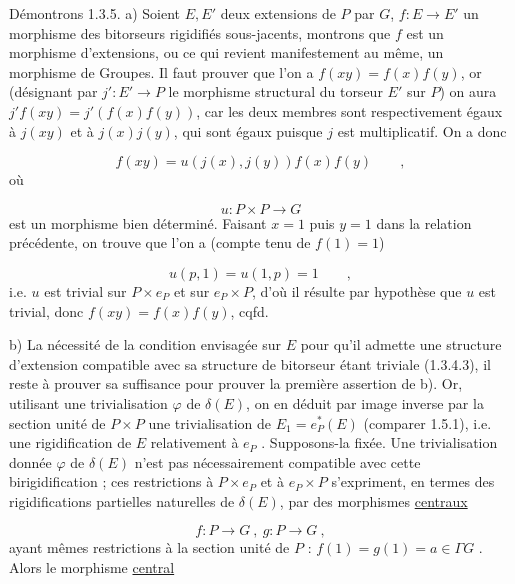 Démontrons 1.3.5.  a)  Soient $E,E'$ deux extensions de $P$ par $G$, $f : E \longrightarrow E'$ un morphisme des bitorseurs rigidifiés sous-jacents, montrons que $f$ est un morphisme d'extensions, ou ce qui revient manifestement au même, un morphisme de Groupes. Il faut prouver que l'on a $f(xy) = f(x)f(y)$, or (désignant par $j' : E' \longrightarrow P$ le morphisme structural du torseur $E'$ sur $P$) on aura $j'f(xy) = j'(f(x)f(y))$, car les deux membres sont respectivement égaux à $j(xy)$ et à $j(x)j(y)$, qui sont égaux puisque $j$ est multiplicatif. On a donc

\begin{equation*}
f(xy) = u(j(x),j(y))f(x)f(y) \qquad ,
\end{equation*}
où

\begin{equation*}
u : P \times P \longrightarrow G
\end{equation*}
est un morphisme bien déterminé. Faisant $x=1$ puis $y=1$ dans la relation précédente, on trouve que l'on a (compte tenu de $f(1)=1$)

\begin{equation*}
u(p,1) = u(1,p) = 1 \qquad ,
\end{equation*}
i.e. $u$ est trivial sur $P \times e_P$ et sur $e_P \times P$, d'où il résulte par hypothèse que $u$ est trivial, donc $f(xy) = f(x)f(y)$, cqfd.

b)  La nécessité de la condition envisagée sur $E$ pour qu'il admette une structure d'extension compatible avec sa structure de bitorseur étant triviale (1.3.4.3), il reste à prouver sa suffisance pour prouver la première assertion de b). Or, utilisant une trivialisation $\varphi$
de $\delta(E)$, on en déduit par image inverse par la section unité de $P \times P$ une trivialisation de $E_1 = e_P^*(E)$ (comparer 1.5.1), i.e. une rigidification de $E$ relativement à $e_P$ . Supposons-la fixée. Une trivialisation donnée $\varphi$ de $\delta(E)$ n'est pas nécessairement compatible avec cette birigidification ; ces restrictions à $P \times e_P$ et à $e_P \times P$ s'expriment, en termes des rigidifications partielles naturelles de $\delta(E)$, par des morphismes \underline{centraux}

\begin{equation*}
f : P \longrightarrow G \ , \ g : P \longrightarrow G \ ,
\end{equation*}
ayant mêmes restrictions à la section unité de $P$ : $f(1) = g(1) = a \in \Gamma G$ . Alors le morphisme \underline{central}


